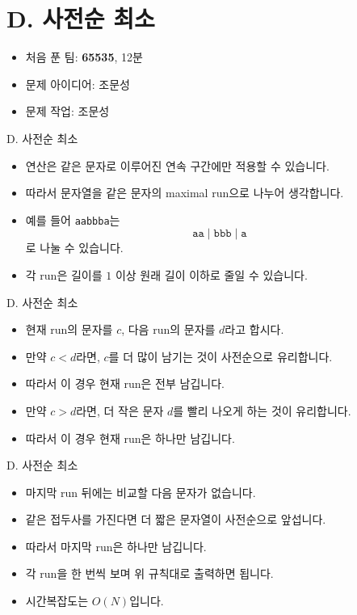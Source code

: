 \def\probno{D}
\def\probtitle{사전순 최소}

\section{\probno{}. \probtitle{}}

\begin{frame}
    \sectiontitle{\probno{}}{\probtitle{}}
    \begin{itemize}
        \item 처음 푼 팀: \textbf{65535}, 12분
        \item 문제 아이디어: 조문성
        \item 문제 작업: 조문성
    \end{itemize}
    
\end{frame}

\begin{frame}{\probno{}. \probtitle{}}
    \begin{itemize}
        \item 연산은 같은 문자로 이루어진 연속 구간에만 적용할 수 있습니다.
        \item 따라서 문자열을 같은 문자의 maximal run으로 나누어 생각합니다.
        \item 예를 들어 \texttt{aabbba}는
        \[
            \texttt{aa} \mid \texttt{bbb} \mid \texttt{a}
        \]
        로 나눌 수 있습니다.
        \item 각 run은 길이를 $1$ 이상 원래 길이 이하로 줄일 수 있습니다.
    \end{itemize}
\end{frame}

\begin{frame}{\probno{}. \probtitle{}}
    \begin{itemize}
        \item 현재 run의 문자를 $c$, 다음 run의 문자를 $d$라고 합시다.
        \item 만약 $c < d$라면, $c$를 더 많이 남기는 것이 사전순으로 유리합니다.
        \item 따라서 이 경우 현재 run은 전부 남깁니다.
        \item 만약 $c > d$라면, 더 작은 문자 $d$를 빨리 나오게 하는 것이 유리합니다.
        \item 따라서 이 경우 현재 run은 하나만 남깁니다.
    \end{itemize}
\end{frame}

\begin{frame}{\probno{}. \probtitle{}}
    \begin{itemize}
        \item 마지막 run 뒤에는 비교할 다음 문자가 없습니다.
        \item 같은 접두사를 가진다면 더 짧은 문자열이 사전순으로 앞섭니다.
        \item 따라서 마지막 run은 하나만 남깁니다.
        \item 각 run을 한 번씩 보며 위 규칙대로 출력하면 됩니다.
        \item 시간복잡도는 $O(N)$입니다.
    \end{itemize}
\end{frame}